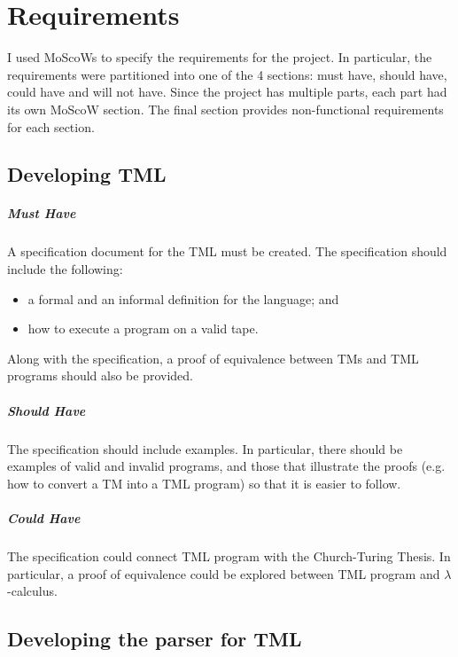 \chapter{Requirements}

I used MoScoWs to specify the requirements for the project. In particular, the requirements were partitioned into one of the 4 sections: must have, should have, could have and will not have. Since the project has multiple parts, each part had its own MoScoW section. The final section provides non-functional requirements for each section.

\section{Developing TML}

\paragraph{Must Have} A specification document for the TML must be created. The specification should include the following:
\begin{itemize}
    \item a formal and an informal definition for the language; and
    \item how to execute a program on a valid tape.
\end{itemize}
Along with the specification, a proof of equivalence between TMs and TML programs should also be provided.

\paragraph{Should Have} The specification should include examples. In particular, there should be examples of valid and invalid programs, and those that illustrate the proofs (e.g. how to convert a TM into a TML program) so that it is easier to follow.

\paragraph{Could Have} The specification could connect TML program with the Church-Turing Thesis. In particular, a proof of equivalence could be explored between TML program and $\lambda$-calculus.

\section{Developing the parser for TML}

